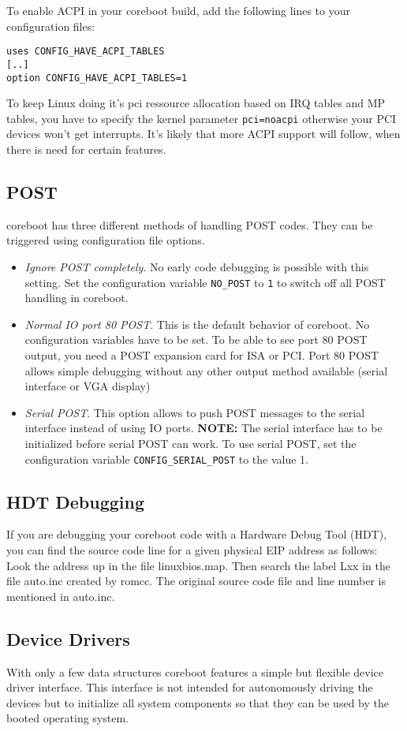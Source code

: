 \documentclass[titlepage,12pt]{article}
\begin{document}
To enable ACPI in your coreboot build, add the following lines to your
configuration files:
\begin{verbatim}
uses CONFIG_HAVE_ACPI_TABLES
[..]
option CONFIG_HAVE_ACPI_TABLES=1
\end{verbatim}

To keep Linux doing it's pci ressource allocation based on IRQ tables and MP
tables, you have to specify the kernel parameter \texttt{pci=noacpi} otherwise
your PCI devices won't get interrupts. 
It's likely that more ACPI support will follow, when there is need for certain
features.

\subsection{POST}
coreboot has three different methods of handling POST codes. They can
be triggered using configuration file options.
\begin{itemize}
\item
\emph{Ignore POST completely}. No early code debugging is possible with
this setting.  Set the configuration variable \texttt{NO\_POST} to
\texttt{1} to switch off all POST handling in coreboot.
\item
\emph{Normal IO port 80 POST}. This is the default behavior of
coreboot. No configuration variables have to be set. To be able to see
port 80 POST output, you need a POST expansion card for ISA or PCI. Port
80 POST allows simple debugging without any other output method
available (serial interface or VGA display)
\item
\emph{Serial POST}. 
This option allows to push POST messages to the serial interface instead
of using IO ports. \textbf{NOTE:} The serial interface has to be
initialized before serial POST can work. To use serial POST, set the
configuration variable \texttt{CONFIG\_SERIAL\_POST} to the value 1.
\end{itemize}


\subsection{HDT Debugging}
If you are debugging your coreboot code with a Hardware Debug Tool
(HDT), you can find the source code line for a given physical EIP
address as follows: Look the address up in the file linuxbios.map. Then
search the label Lxx in the file auto.inc created by romcc. The original
source code file and line number is mentioned in auto.inc.


\subsection{Device Drivers}
With only a few data structures coreboot features a simple but flexible
device driver interface. This interface is not intended for autonomously
driving the devices but to initialize all system components so that they
can be used by the booted operating system.
\end{document}
